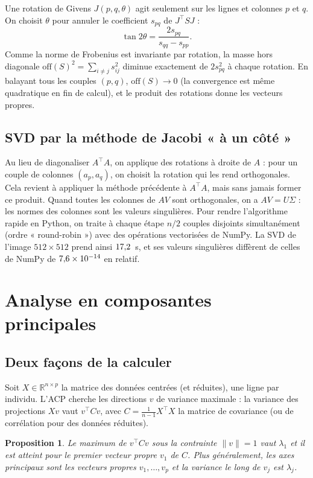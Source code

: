 \documentclass[11pt,a4paper]{article}
\newtheorem{proposition}{Proposition}
\theoremstyle{remark}
\newcommand{\R}{\mathbb{R}}
\begin{document}
Une rotation de Givens $J(p,q,\theta)$ agit seulement sur les lignes et colonnes $p$ et $q$. On choisit $\theta$ pour annuler le coefficient $s_{pq}$ de $J^\top S J$ :
\[
  \tan 2\theta = \frac{2 s_{pq}}{s_{qq} - s_{pp}} .
\]
Comme la norme de Frobenius est invariante par rotation, la masse hors diagonale $\mathrm{off}(S)^2 = \sum_{i\ne j} s_{ij}^2$ diminue exactement de $2 s_{pq}^2$ à chaque rotation. En balayant tous les couples $(p,q)$, $\mathrm{off}(S) \to 0$ (la convergence est même quadratique en fin de calcul), et le produit des rotations donne les vecteurs propres.

\subsection{SVD par la méthode de Jacobi « à un côté »}

Au lieu de diagonaliser $A^\top A$, on applique des rotations à droite de $A$ : pour un couple de colonnes $(a_p, a_q)$, on choisit la rotation qui les rend orthogonales. Cela revient à appliquer la méthode précédente à $A^\top A$, mais sans jamais former ce produit. Quand toutes les colonnes de $AV$ sont orthogonales, on a $AV = U\Sigma$ : les normes des colonnes sont les valeurs singulières. Pour rendre l'algorithme rapide en Python, on traite à chaque étape $n/2$ couples disjoints simultanément (ordre « round-robin ») avec des opérations vectorisées de NumPy. La SVD de l'image $512\times512$ prend ainsi $17{,}2$~s, et ses valeurs singulières diffèrent de celles de NumPy de $7{,}6 \times 10^{-14}$ en relatif.

\section{Analyse en composantes principales}

\subsection{Deux façons de la calculer}

Soit $X \in \R^{n\times p}$ la matrice des données centrées (et réduites), une ligne par individu. L'ACP cherche les directions $v$ de variance maximale : la variance des projections $Xv$ vaut $v^\top C v$, avec $C = \frac{1}{n-1} X^\top X$ la matrice de covariance (ou de corrélation pour des données réduites).

\begin{proposition}
Le maximum de $v^\top C v$ sous la contrainte $\lVert v\rVert = 1$ vaut $\lambda_1$ et il est atteint pour le premier vecteur propre $v_1$ de $C$. Plus généralement, les axes principaux sont les vecteurs propres $v_1, \dots, v_p$ et la variance le long de $v_j$ est $\lambda_j$.
\end{proposition}
\end{document}
